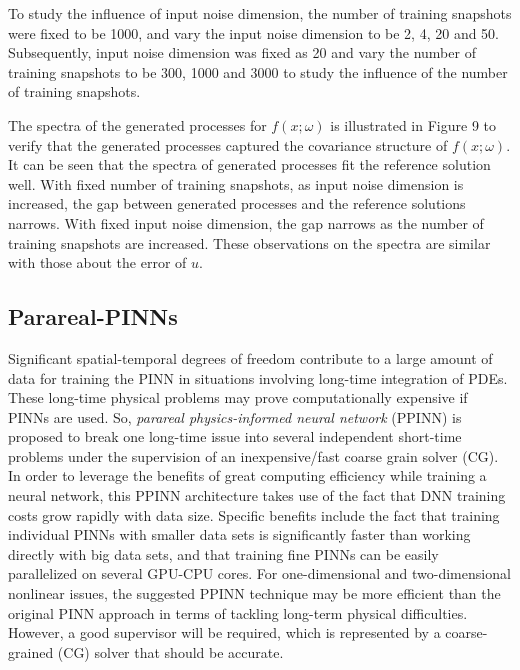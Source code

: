 \documentclass[conference,compsoc]{IEEEtran}
\begin{document}
To study the influence of input noise dimension, the number of training snapshots were fixed to be 1000, and vary the input noise dimension to be 2, 4, 20 and 50. Subsequently, input noise dimension was fixed as 20 and vary the number of training snapshots to be 300, 1000 and 3000 to study the influence of the number of training snapshots\cite{yang2018physics}.



The spectra of the generated processes for $f(x;\omega)$ is illustrated in Figure 9  to verify that the generated processes captured the covariance structure of $f(x;\omega)$. It can be seen that the spectra of generated processes fit the reference solution well. With fixed number of training snapshots, as input noise dimension is increased, the gap between generated processes and the reference solutions narrows\cite{zhu2019physics}. With fixed input noise dimension, the gap narrows as the number of training snapshots are increased. These observations on the spectra are similar with those about the error of $u$\cite{yang2018physics}.



\subsection{Parareal-PINNs}
Significant spatial-temporal degrees of freedom contribute to a large amount of data for training the PINN in situations involving long-time integration of PDEs\cite{meng2020ppinn}. These long-time physical problems may prove computationally expensive if PINNs are used\cite{cai2021physics}\cite{zhang2020learning}.
%
So, \emph{parareal physics-informed neural network} (PPINN) is proposed to break one long-time issue into several independent short-time problems under the supervision of an inexpensive/fast coarse grain solver (CG)\cite{meng2020ppinn}. In order to leverage the benefits of great computing efficiency while training a neural network, this PPINN architecture takes use of the fact that DNN training costs grow rapidly with data size. Specific benefits include the fact that training individual PINNs with smaller data sets is significantly faster than working directly with big data sets, and that training fine PINNs can be easily parallelized on several GPU-CPU cores\cite{meng2020ppinn}. For one-dimensional and two-dimensional nonlinear issues, the suggested PPINN technique may be more efficient than the original PINN approach in terms of tackling long-term physical difficulties\cite{cai2021physics}. However, a good supervisor will be required, which is represented by a coarse-grained (CG) solver that should be accurate\cite{meng2020ppinn}.
\end{document}

